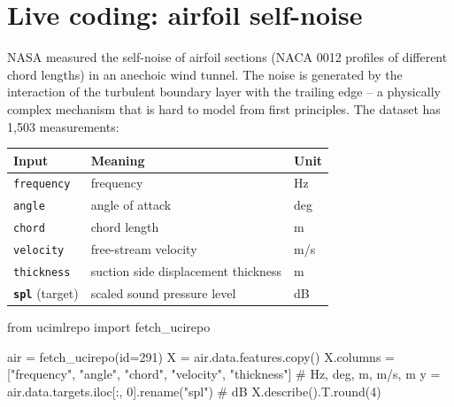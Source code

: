 \documentclass[
  letterpaper,
  DIV=11,
  numbers=noendperiod]{scrreprt}
\newenvironment{Shaded}{\begin{snugshade}}{\end{snugshade}}
\newcommand{\BuiltInTok}[1]{\textcolor[rgb]{0.00,0.23,0.31}{#1}}
\newcommand{\CommentTok}[1]{\textcolor[rgb]{0.37,0.37,0.37}{#1}}
\newcommand{\DecValTok}[1]{\textcolor[rgb]{0.68,0.00,0.00}{#1}}
\newcommand{\ImportTok}[1]{\textcolor[rgb]{0.00,0.46,0.62}{#1}}
\newcommand{\NormalTok}[1]{\textcolor[rgb]{0.00,0.23,0.31}{#1}}
\newcommand{\OperatorTok}[1]{\textcolor[rgb]{0.37,0.37,0.37}{#1}}
\newcommand{\StringTok}[1]{\textcolor[rgb]{0.13,0.47,0.30}{#1}}
\begin{document}
\section{Live coding: airfoil
self-noise}\label{live-coding-airfoil-self-noise}

NASA measured the self-noise of airfoil sections (NACA 0012 profiles of
different chord lengths) in an anechoic wind tunnel. The noise is
generated by the interaction of the turbulent boundary layer with the
trailing edge -- a physically complex mechanism that is hard to model
from first principles. The dataset has 1,503 measurements:

\begin{longtable}[]{@{}lll@{}}
\toprule\noalign{}
Input & Meaning & Unit \\
\midrule\noalign{}
\endhead
\bottomrule\noalign{}
\endlastfoot
\texttt{frequency} & frequency & Hz \\
\texttt{angle} & angle of attack & deg \\
\texttt{chord} & chord length & m \\
\texttt{velocity} & free-stream velocity & m/s \\
\texttt{thickness} & suction side displacement thickness & m \\
\textbf{\texttt{spl}} (target) & scaled sound pressure level & dB \\
\end{longtable}

\begin{Shaded}
\begin{Highlighting}[]
\ImportTok{from}\NormalTok{ ucimlrepo }\ImportTok{import}\NormalTok{ fetch\_ucirepo}

\NormalTok{air }\OperatorTok{=}\NormalTok{ fetch\_ucirepo(}\BuiltInTok{id}\OperatorTok{=}\DecValTok{291}\NormalTok{)}
\NormalTok{X }\OperatorTok{=}\NormalTok{ air.data.features.copy()}
\NormalTok{X.columns }\OperatorTok{=}\NormalTok{ [}\StringTok{"frequency"}\NormalTok{, }\StringTok{"angle"}\NormalTok{, }\StringTok{"chord"}\NormalTok{, }\StringTok{"velocity"}\NormalTok{, }\StringTok{"thickness"}\NormalTok{]   }\CommentTok{\# Hz, deg, m, m/s, m}
\NormalTok{y }\OperatorTok{=}\NormalTok{ air.data.targets.iloc[:, }\DecValTok{0}\NormalTok{].rename(}\StringTok{"spl"}\NormalTok{)                           }\CommentTok{\# dB}
\NormalTok{X.describe().T.}\BuiltInTok{round}\NormalTok{(}\DecValTok{4}\NormalTok{)}
\end{Highlighting}
\end{Shaded}
\end{document}
